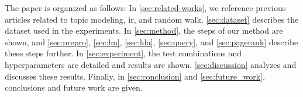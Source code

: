The paper is organized as follows:
In \autoref{sec:related-works}, we reference previous articles related to topic modeling, \gls{ir}, and random walk.
\autoref{sec:dataset} describes the dataset used in the experiments.
In \autoref{sec:method}, the steps of our method are shown, and \autoref{sec:prepro}, \autoref{sec:lm}, \autoref{sec:lda}, \autoref{sec:query}, and \autoref{sec:pagerank} describe these steps further.
In \autoref{sec:experiment}, the test combinations and hyperparameters are detailed and results are shown.
\autoref{sec:discussion} analyzes and discusses these results.
Finally, in \autoref{sec:conclusion} and \autoref{sec:future_work}, conclusions and future work are given.
